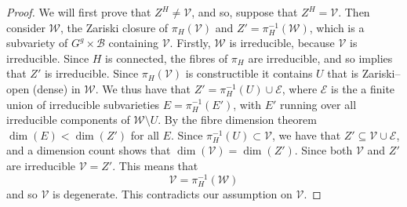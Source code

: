 \documentclass[12pt, reqno]{amsart}
\theoremstyle{remark}
\theoremstyle{definition}
\numberwithin{equation}{section}
\begin{document}
\begin{proof}
We will first prove that $Z^H \neq \mathcal{V}$, and so, suppose that $Z^H = \mathcal{V}$. Then consider $\mathcal{W}$, the Zariski closure of $\pi_H(\mathcal{V})$ and $Z' = \pi_H^{-1}(\mathcal{W})$, which is a subvariety of $G^g \times \mathcal{B}$ containing $\mathcal{V}$. Firstly, $\mathcal{W}$ is irreducible, because $\mathcal{V}$ is irreducible. Since $H$ is connected, the fibres of $\pi_H$ are irreducible, and so \cite[Theorem 1.26]{Shafarevic} implies that $Z'$ is irreducible.  
Since $\pi_H(\mathcal{V})$ is constructible it contains $U$ that is  Zariski--open (dense) in $\mathcal{W}$. We thus have that $Z' = \pi_H^{-1}(U) \cup \mathcal{E} $, where $\mathcal{E}$ is the a finite union of irreducible subvarieties $E = \pi_{H}^{-1}(E')$, with $E'$ running over all irreducible components of $\mathcal{W}\setminus U$. By the fibre dimension theorem $\dim(E) < \dim(Z')$ for all $E$. Since $\pi_H^{-1}(U)\subset \mathcal{V}$, we have that $Z' \subseteq \mathcal{V}\cup \mathcal{E}$, and a dimension count shows that $\dim(\mathcal{V}) = \dim(Z')$. Since both $\mathcal{V}$ and $Z'$ are irreducible $\mathcal{V} = Z'$.  
This means that 
$$\mathcal{V} = \pi_H^{-1}(\mathcal{W}) $$
and so $\mathcal{V}$ is degenerate. This contradicts our assumption on $\mathcal{V}$. 




\end{proof}
\end{document}
